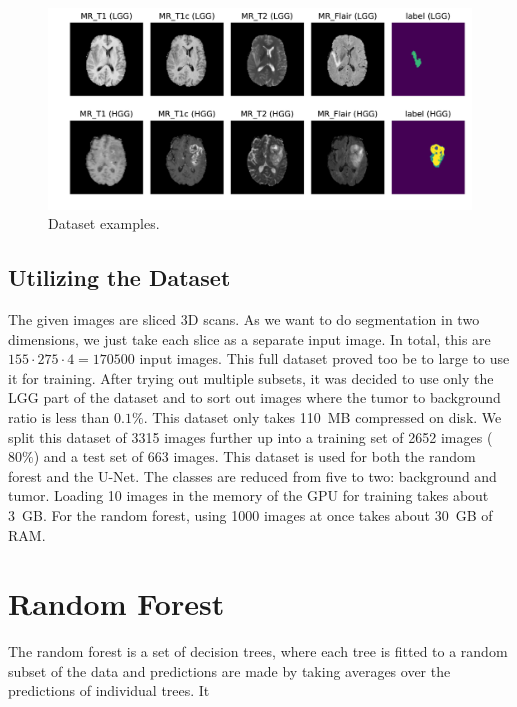\documentclass[final]{article}
\begin{document}
\begin{figure}
\centering
\includegraphics[width=0.99\linewidth]{scan_types_both}
\caption{Dataset examples. }
\label{fig:dataex}
\end{figure}

\subsection{Utilizing the Dataset}
The given images are sliced 3D scans. As we want to do segmentation in two
dimensions, we just take each slice as a separate input image. In total, this
are $155\cdot275\cdot4 = 170500$ input images. This full dataset proved too be
to large to use it for training. After trying out multiple subsets, it was
decided to use only the LGG part of the dataset and to sort out images where
the tumor to background ratio is less than $0.1\%$. This dataset only takes
\SI{110}{MB} compressed on disk. We split this dataset of 3315 images further
up into a training set of 2652 images ($80\%$) and a test set of 663 images.
This dataset is used for both the random forest and the U-Net. The classes are
reduced from five to two: background and tumor. Loading 10 images in the memory
of the GPU for training takes about \SI{3}{GB}. For the random forest, using
1000 images at once takes about \SI{30}{GB} of RAM.

\section{Random Forest}
The random forest is a set of decision trees, where each tree is fitted to a
random subset of the data and predictions are made by taking averages over the
predictions of individual trees. It 
\end{document}
